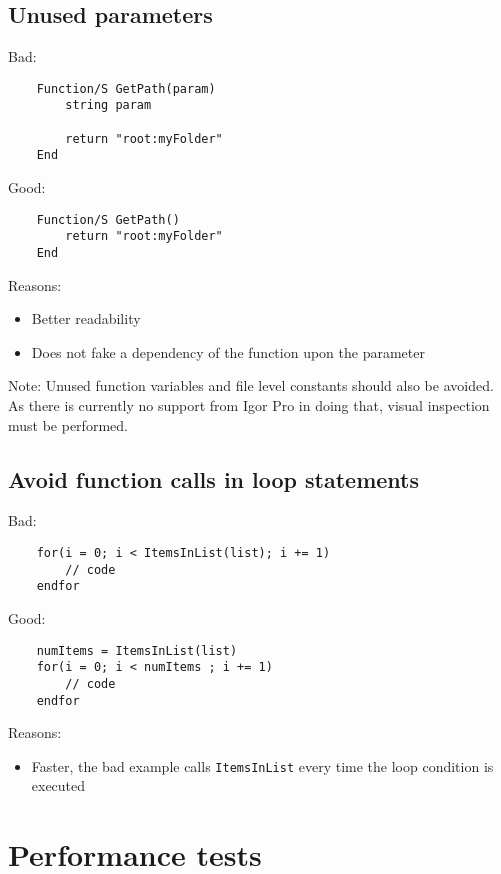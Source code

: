 \documentclass{scrartcl}
\begin{document}
\subsection{Unused parameters}
Bad:
\begin{verbatim}
	Function/S GetPath(param)
		string param

		return "root:myFolder" 
	End
\end{verbatim}
\pagebreak
Good:
\begin{verbatim}
	Function/S GetPath()
		return "root:myFolder" 
	End
\end{verbatim}
Reasons:
\begin{itemize}
  \item Better readability
  \item Does not fake a dependency of the function upon the parameter
\end{itemize}
Note: Unused function variables and file level constants should also be avoided. As there is currently no support from 
Igor Pro in doing that, visual inspection must be performed.
%
\subsection{Avoid function calls in loop statements}
Bad:
\begin{verbatim}
	for(i = 0; i < ItemsInList(list); i += 1)
		// code
	endfor
\end{verbatim}
Good:
\begin{verbatim}
	numItems = ItemsInList(list)
	for(i = 0; i < numItems ; i += 1)
		// code
	endfor
\end{verbatim}
Reasons:
\begin{itemize}
  \item Faster, the bad example calls \texttt{ItemsInList} every time the loop condition is executed
\end{itemize}
%
\section{Performance tests}
%
\end{document}
